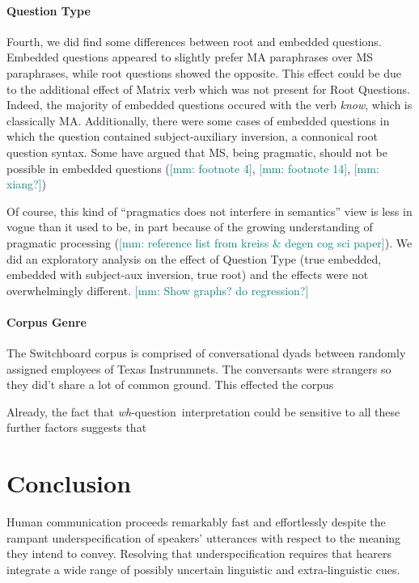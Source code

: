 \documentclass[12pt,letterpaper,table,svgnames,dvipsnames]{article}
\newcommand{\mm}[1]{\textcolor{teal}{[mm: #1]}}
\newcommand{\whq}{\emph{wh}-question~}
\begin{document}
\paragraph{Question Type}
Fourth, we did find some differences between root and embedded questions. Embedded questions appeared to slightly prefer MA paraphrases over MS paraphrases, while root questions showed the opposite. This effect could be due to the additional effect of Matrix verb which was not present for Root Questions. Indeed, the majority of embedded questions occured with the verb \emph{know}, which is classically MA. Additionally, there were some cases of embedded questions in which the question contained subject-auxiliary inversion, a connonical root question syntax. Some have argued that MS, being pragmatic, should not be possible in embedded questions (\cite{karttunen1977}\mm{footnote 4}, \cite{groenstok1984}\mm{footnote 14}, \mm{xiang?})

Of course, this kind of ``pragmatics does not interfere in semantics'' view is less in vogue than it used to be, in part because of the growing understanding of pragmatic processing (\mm{reference list from kreiss \& degen cog sci paper}). We did an exploratory analysis on the effect of Question Type (true embedded, embedded with subject-aux inversion, true root) and the effects were not overwhelmingly different. \mm{Show graphs? do regression?} 


\paragraph{Corpus Genre}
The Switchboard corpus is comprised of conversational dyads between randomly assigned employees of Texas Instrunmnets. The conversants were strangers so they did't share a lot of common ground. This effected the corpus 

Already, the fact that \whq interpretation could be sensitive to all these further factors suggests that 


\section{Conclusion}

Human communication proceeds remarkably fast and effortlessly despite the rampant underspecification of speakers' utterances with respect to the meaning they intend to convey. Resolving that underspecification requires that hearers integrate a wide range of possibly uncertain linguistic and extra-linguistic cues. 
\end{document}

